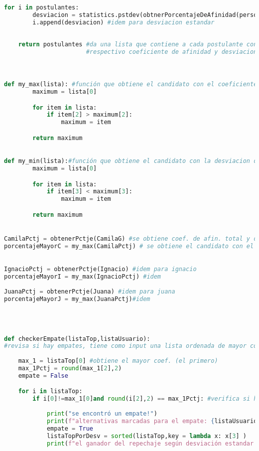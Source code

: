 \documentclass[a4paper]{article}
\begin{document}
\begin{lstlisting}[language=Python]
    for i in postulantes:
        desviacion = statistics.pstdev(obtnerPorcentajeDeAfinidad(persona,i[1]))
        i.append(desviacion) #idem para desviacion estandar
   
    
    return postulantes #da una lista que contiene a cada postulante con su
                       #respectivo coeficiente de afinidad y desviacion estandar



def my_max(lista): #función que obtiene el candidato con el coeficiente de afinidad total mayor
        maximum = lista[0]

        for item in lista:
            if item[2] > maximum[2]:
                maximum = item

        return maximum    

   
def my_min(lista):#función que obtiene el candidato con la desviacion de afinidad total menor
        maximum = lista[0]

        for item in lista:
            if item[3] < maximum[3]:
                maximum = item

        return maximum 


CamilaPctj = obtenerPctje(CamilaG) #se obtiene coef. de afin. total y desv. estandar de camila con cada candidato
porcentajeMayorC = my_max(CamilaPctj) # se obtiene el candidato con el mayor coef. de afin. tot.
 

IgnacioPctj = obtenerPctje(Ignacio) #idem para ignacio
porcentajeMayorI = my_max(IgnacioPctj) #idem
     
JuanaPctj = obtenerPctje(Juana) #idem para juana
porcentajeMayorJ = my_max(JuanaPctj)#idem
     



def checkerEmpate(listaTop,listaUsuario):
#revisa si hay empates, tiene como input una lista ordenada de mayor coef. de afin. tot a menor. 
    
    max_1 = listaTop[0] #obtiene el mayor coef. (el primero)
    max_1Pctj = round(max_1[2],2)
    empate = False

    for i in listaTop:
        if i[0]!=max_1[0]and round(i[2],2) == max_1Pctj: #verifica si hay empates
            
            print("se encontró un empate!")
            print(f"alternativas marcadas para el empate: {listaUsuario}")
            empate = True
            listaTopPorDesv = sorted(listaTop,key = lambda x: x[3] )
            print(f"el ganador del repechaje según desviación estandar es {listaTopPorDesv[0][0]}")
            

\end{lstlisting}
\end{document}
